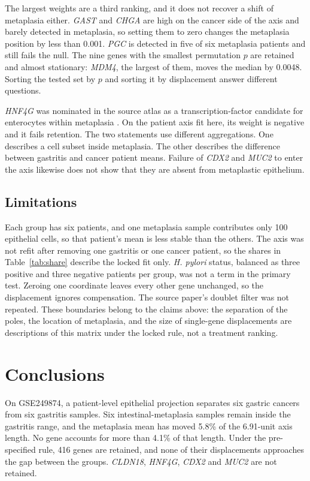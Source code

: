 \documentclass[11pt,a4paper]{article}
\begin{document}
The largest weights are a third ranking, and it does not recover a shift of metaplasia either. \textit{GAST} and \textit{CHGA} are high on the cancer side of the axis and barely detected in metaplasia, so setting them to zero changes the metaplasia position by less than 0.001. \textit{PGC} is detected in five of six metaplasia patients and still fails the null. The nine genes with the smallest permutation \(p\) are retained and almost stationary: \textit{MDM4}, the largest of them, moves the median by 0.0048. Sorting the tested set by \(p\) and sorting it by displacement answer different questions.

\textit{HNF4G} was nominated in the source atlas as a transcription-factor candidate for enterocytes within metaplasia \cite{li2025}. On the patient axis fit here, its weight is negative and it fails retention. The two statements use different aggregations. One describes a cell subset inside metaplasia. The other describes the difference between gastritis and cancer patient means. Failure of \textit{CDX2} and \textit{MUC2} to enter the axis likewise does not show that they are absent from metaplastic epithelium.

\subsection{Limitations}

Each group has six patients, and one metaplasia sample contributes only 100 epithelial cells, so that patient's mean is less stable than the others. The axis was not refit after removing one gastritis or one cancer patient, so the shares in Table~\ref{tab:share} describe the locked fit only. \textit{H. pylori} status, balanced as three positive and three negative patients per group, was not a term in the primary test. Zeroing one coordinate leaves every other gene unchanged, so the displacement ignores compensation. The source paper's doublet filter was not repeated. These boundaries belong to the claims above: the separation of the poles, the location of metaplasia, and the size of single-gene displacements are descriptions of this matrix under the locked rule, not a treatment ranking.

\section{Conclusions}

On GSE249874, a patient-level epithelial projection separates six gastric cancers from six gastritis samples. Six intestinal-metaplasia samples remain inside the gastritis range, and the metaplasia mean has moved 5.8\% of the 6.91-unit axis length. No gene accounts for more than 4.1\% of that length. Under the pre-specified rule, 416 genes are retained, and none of their displacements approaches the gap between the groups. \textit{CLDN18}, \textit{HNF4G}, \textit{CDX2} and \textit{MUC2} are not retained.
\end{document}
